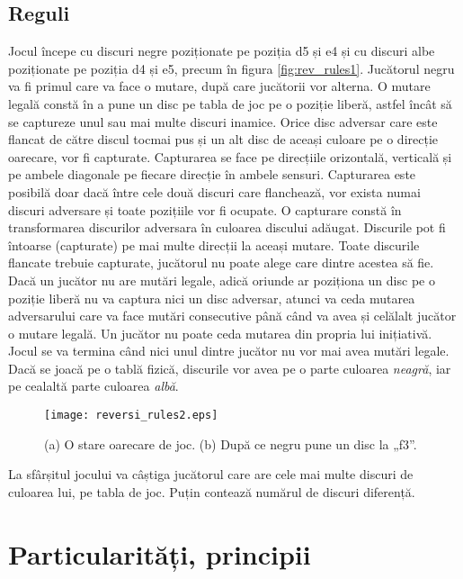 \documentclass[12pt,twoside,a4paper,fleqn]{book}
\theoremstyle{definition}
\begin{document}
\subsection{Reguli}
Jocul începe cu discuri negre poziționate pe poziția d5 și e4 și cu discuri albe poziționate pe poziția d4 și e5, precum în figura \ref{fig:rev_rules1}. Jucătorul negru va fi primul care va face o mutare, după care jucătorii vor alterna. O mutare legală constă în a pune un disc pe tabla de joc pe o poziție liberă, astfel încât să se captureze unul sau mai multe discuri inamice. Orice disc adversar care este flancat de către discul tocmai pus și un alt disc de aceași culoare pe o direcție oarecare, vor fi capturate. Capturarea se face pe direcțiile orizontală, verticală și pe ambele diagonale pe fiecare direcție în ambele sensuri. Capturarea este posibilă doar dacă între cele două discuri care flanchează, vor exista numai discuri adversare și toate pozițiile vor fi ocupate. O capturare constă în transformarea discurilor adversara în culoarea discului adăugat. Discurile pot fi întoarse (capturate) pe mai multe direcții la aceași mutare. Toate discurile flancate trebuie capturate, jucătorul nu poate alege care dintre acestea să fie. Dacă un jucător nu are mutări legale, adică oriunde ar poziționa un disc pe o poziție liberă nu va captura nici un disc adversar, atunci va ceda mutarea adversarului care va face mutări consecutive până când va avea și celălalt jucător o mutare legală. Un jucător nu poate ceda mutarea din propria lui inițiativă. Jocul se va termina când nici unul dintre jucător nu vor mai avea mutări legale.\\
Dacă se joacă pe o tablă fizică, discurile vor avea pe o parte culoarea \emph{neagră}, iar pe cealaltă parte culoarea \emph{albă}. \cite{othello_fang, othello_master}\\

\begin{figure}[h]
\begin{center}
\texttt{[image: reversi\_rules2.eps]}
\caption{\small{(a) O stare oarecare de joc. (b) După ce negru pune un disc la „f3”.}}
\label{fig:rev_rules2}
\end{center}
\end{figure}

La sfârșitul jocului va câștiga jucătorul care are cele mai multe discuri de culoarea lui, pe tabla de joc. Puțin contează numărul de discuri diferență.

\section{Particularități, principii}
\end{document}
